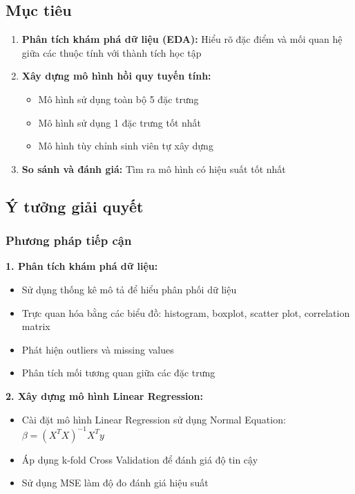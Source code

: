 \subsection{Mục tiêu}
\begin{enumerate}
	\item \textbf{Phân tích khám phá dữ liệu (EDA):} Hiểu rõ đặc điểm và mối quan hệ giữa các thuộc tính với thành tích học tập
	\item \textbf{Xây dựng mô hình hồi quy tuyến tính:}
	      \begin{itemize}
		      \item Mô hình sử dụng toàn bộ 5 đặc trưng
		      \item Mô hình sử dụng 1 đặc trưng tốt nhất
		      \item Mô hình tùy chỉnh sinh viên tự xây dựng
	      \end{itemize}
	\item \textbf{So sánh và đánh giá:} Tìm ra mô hình có hiệu suất tốt nhất
\end{enumerate}

\subsection{Ý tưởng giải quyết}

\subsubsection{Phương pháp tiếp cận}
\textbf{1. Phân tích khám phá dữ liệu:}
\begin{itemize}
	\item Sử dụng thống kê mô tả để hiểu phân phối dữ liệu
	\item Trực quan hóa bằng các biểu đồ: histogram, boxplot, scatter plot, correlation matrix
	\item Phát hiện outliers và missing values
	\item Phân tích mối tương quan giữa các đặc trưng
\end{itemize}

\textbf{2. Xây dựng mô hình Linear Regression:}
\begin{itemize}
	\item Cài đặt mô hình Linear Regression sử dụng Normal Equation: \(\beta = {(X^{T}X)}^{-1}X^{T}y\)
	\item Áp dụng k-fold Cross Validation để đánh giá độ tin cậy
	\item Sử dụng MSE làm độ đo đánh giá hiệu suất
\end{itemize}

